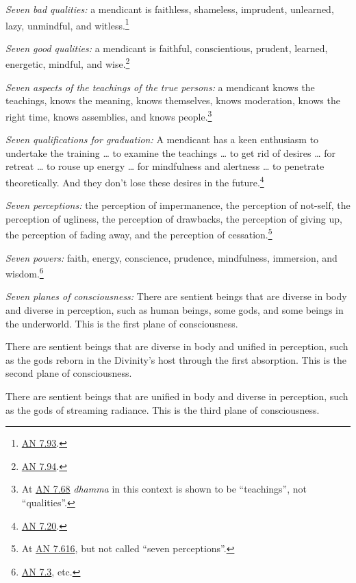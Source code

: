 \documentclass[12pt,openany]{book}%
\begin{document}
\emph{Seven bad qualities:} a mendicant is faithless, shameless, imprudent, unlearned, lazy, unmindful, and witless.\footnote{\href{https://suttacentral.net/an7.93/en/sujato}{AN 7.93}. } 

\emph{Seven good qualities:} a mendicant is faithful, conscientious, prudent, learned, energetic, mindful, and wise.\footnote{\href{https://suttacentral.net/an7.94/en/sujato}{AN 7.94}. } 

\emph{Seven aspects of the teachings of the true persons:} a mendicant knows the teachings, knows the meaning, knows themselves, knows moderation, knows the right time, knows assemblies, and knows people.\footnote{At \href{https://suttacentral.net/an7.68/en/sujato}{AN 7.68} \textit{dhamma} in this context is shown to be “teachings”, not “qualities”. } 

\emph{Seven qualifications for graduation:} A mendicant has a keen enthusiasm to undertake the training … to examine the teachings … to get rid of desires … for retreat … to rouse up energy … for mindfulness and alertness … to penetrate theoretically. And they don’t lose these desires in the future.\footnote{\href{https://suttacentral.net/an7.20/en/sujato}{AN 7.20}. } 

\emph{Seven perceptions:} the perception of impermanence, the perception of not-self, the perception of ugliness, the perception of drawbacks, the perception of giving up, the perception of fading away, and the perception of cessation.\footnote{At \href{https://suttacentral.net/an7.616/en/sujato}{AN 7.616}, but not called “seven perceptions”. } 

\emph{Seven powers:} faith, energy, conscience, prudence, mindfulness, immersion, and wisdom.\footnote{\href{https://suttacentral.net/an7.3/en/sujato}{AN 7.3}, etc. } 

\emph{Seven planes of consciousness:} There are sentient beings that are diverse in body and diverse in perception, such as human beings, some gods, and some beings in the underworld. This is the first plane of consciousness. 

There are sentient beings that are diverse in body and unified in perception, such as the gods reborn in the Divinity’s host through the first absorption. This is the second plane of consciousness. 

There are sentient beings that are unified in body and diverse in perception, such as the gods of streaming radiance. This is the third plane of consciousness. 
\end{document}
